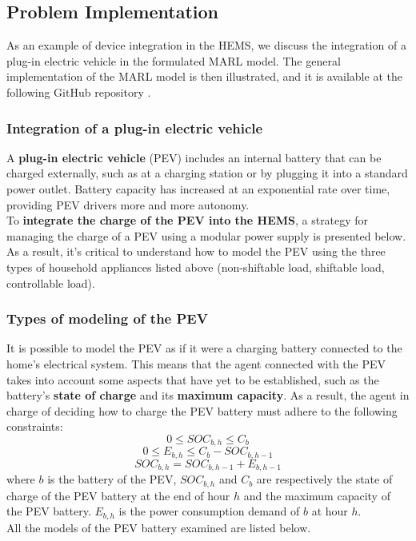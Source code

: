 \subsection{Problem Implementation}
As an example of device integration in the HEMS, we discuss the integration of a plug-in electric vehicle in the formulated MARL model. The general implementation of the MARL model is then illustrated, and it is available at the following GitHub repository \cite{project}.

\subsubsection{Integration of a plug-in electric vehicle}
A \textbf{plug-in electric vehicle} (PEV) includes an internal battery that can be charged externally, such as at a charging station or by plugging it into a standard power outlet. Battery capacity has increased at an exponential rate over time, providing PEV drivers more and more autonomy.\\
To \textbf{integrate the charge of the PEV into the HEMS}, a strategy for managing the charge of a PEV using a modular power supply is presented below. As a result, it's critical to understand how to model the PEV using the three types of household appliances listed above (non-shiftable load, shiftable load, controllable load).

\subsubsection{Types of modeling of the PEV}
\label{subsec:tipmod}
It is possible to model the PEV as if it were a charging battery connected to the home's electrical system. This means that the agent connected with the PEV takes into account some aspects that have yet to be established, such as the battery's \textbf{state of charge} and its \textbf{maximum capacity}. As a result, the agent in charge of deciding how to charge the PEV battery must adhere to the following constraints:
\begin{equation}
\label{eq:vincolo1}
0 \leq SOC_{b,h} \leq C_b
\end{equation}
\begin{equation}
\label{eq:vincolo2}
0 \leq E_{b,h} \leq C_b - SOC_{b,h-1}
\end{equation}
\begin{equation}
\label{eq:vincolo3}
SOC_{b,h} = SOC_{b,h-1} + E_{b,h-1}
\end{equation}
where $b$ is the battery of the PEV, $SOC_{b,h}$ and $C_b$ are respectively the state of charge of the PEV battery at the end of hour $h$ and the maximum capacity of the PEV battery. $E_{b,h}$ is the power consumption demand of $b$ at hour $h$.\\
All the models of the PEV battery examined are listed below.

